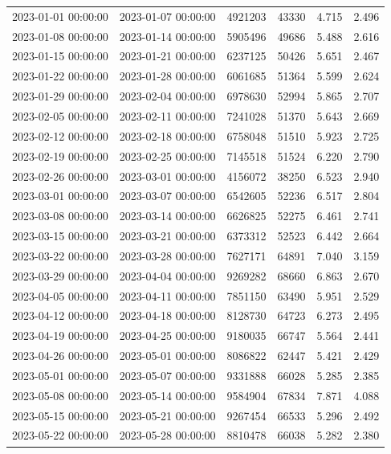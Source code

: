\begin{tabular}{llrrrr}
2023-01-01 00:00:00 & 2023-01-07 00:00:00 & 4921203 & 43330 & 4.715 & 2.496 \\
2023-01-08 00:00:00 & 2023-01-14 00:00:00 & 5905496 & 49686 & 5.488 & 2.616 \\
2023-01-15 00:00:00 & 2023-01-21 00:00:00 & 6237125 & 50426 & 5.651 & 2.467 \\
2023-01-22 00:00:00 & 2023-01-28 00:00:00 & 6061685 & 51364 & 5.599 & 2.624 \\
2023-01-29 00:00:00 & 2023-02-04 00:00:00 & 6978630 & 52994 & 5.865 & 2.707 \\
2023-02-05 00:00:00 & 2023-02-11 00:00:00 & 7241028 & 51370 & 5.643 & 2.669 \\
2023-02-12 00:00:00 & 2023-02-18 00:00:00 & 6758048 & 51510 & 5.923 & 2.725 \\
2023-02-19 00:00:00 & 2023-02-25 00:00:00 & 7145518 & 51524 & 6.220 & 2.790 \\
2023-02-26 00:00:00 & 2023-03-01 00:00:00 & 4156072 & 38250 & 6.523 & 2.940 \\
2023-03-01 00:00:00 & 2023-03-07 00:00:00 & 6542605 & 52236 & 6.517 & 2.804 \\
2023-03-08 00:00:00 & 2023-03-14 00:00:00 & 6626825 & 52275 & 6.461 & 2.741 \\
2023-03-15 00:00:00 & 2023-03-21 00:00:00 & 6373312 & 52523 & 6.442 & 2.664 \\
2023-03-22 00:00:00 & 2023-03-28 00:00:00 & 7627171 & 64891 & 7.040 & 3.159 \\
2023-03-29 00:00:00 & 2023-04-04 00:00:00 & 9269282 & 68660 & 6.863 & 2.670 \\
2023-04-05 00:00:00 & 2023-04-11 00:00:00 & 7851150 & 63490 & 5.951 & 2.529 \\
2023-04-12 00:00:00 & 2023-04-18 00:00:00 & 8128730 & 64723 & 6.273 & 2.495 \\
2023-04-19 00:00:00 & 2023-04-25 00:00:00 & 9180035 & 66747 & 5.564 & 2.441 \\
2023-04-26 00:00:00 & 2023-05-01 00:00:00 & 8086822 & 62447 & 5.421 & 2.429 \\
2023-05-01 00:00:00 & 2023-05-07 00:00:00 & 9331888 & 66028 & 5.285 & 2.385 \\
2023-05-08 00:00:00 & 2023-05-14 00:00:00 & 9584904 & 67834 & 7.871 & 4.088 \\
2023-05-15 00:00:00 & 2023-05-21 00:00:00 & 9267454 & 66533 & 5.296 & 2.492 \\
2023-05-22 00:00:00 & 2023-05-28 00:00:00 & 8810478 & 66038 & 5.282 & 2.380 \\

\end{tabular}
